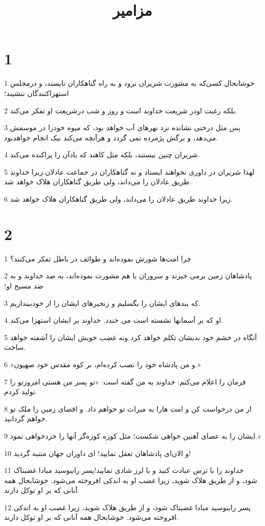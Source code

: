 

\title{مزامير}

 
\chapter{1}

\par 1 خوشابحال کسی‌که به مشورت شریران نرود و به راه گناهکاران نایستد، و درمجلس استهزاکنندگان ننشیند؛
\par 2 بلکه رغبت اودر شریعت خداوند است و روز و شب درشریعت او تفکر می‌کند.
\par 3 پس مثل درختی نشانده نزد نهرهای آب خواهد بود، که میوه خودرا در موسمش می‌دهد، و برگش پژمرده نمی گردد و هر‌آنچه می‌کند نیک انجام خواهدبود.
\par 4 شریران چنین نیستند، بلکه مثل کاهند که بادآن را پراکنده می‌کند.
\par 5 لهذا شریران در داوری نخواهند ایستاد و نه گناهکاران در جماعت عادلان.زیرا خداوند طریق عادلان را می‌داند، ولی طریق گناهکاران هلاک خواهد شد.
\par 6 زیرا خداوند طریق عادلان را می‌داند، ولی طریق گناهکاران هلاک خواهد شد.
 
\chapter{2}

\par 1 چرا امت‌ها شورش نموده‌اند و طوائف در باطل تفکر می‌کنند؟
\par 2 پادشاهان زمین برمی خیزند و سروران با هم مشورت نموده‌اند، به ضد خداوند و به ضد مسیح او؛
\par 3 که بندهای ایشان را بگسلیم و زنجیرهای ایشان را از خودبیندازیم.
\par 4 او که بر آسمانها نشسته است می خندد. خداوند بر ایشان استهزا می‌کند.
\par 5 آنگاه در خشم خود بدیشان تکلم خواهد کرد وبه غضب خویش ایشان را آشفته خواهد ساخت.
\par 6 «و من پادشاه خود را نصب کرده‌ام، بر کوه مقدس خود صهیون.»
\par 7 فرمان را اعلام می‌کنم: خداوند به من گفته است: «تو پسر من هستی امروزتو را تولید کردم.
\par 8 از من درخواست کن و امت هارا به میراث تو خواهم داد. و اقصای زمین را ملک تو خواهم گردانید.
\par 9 ایشان را به عصای آهنین خواهی شکست؛ مثل کوزه کوزه‌گر آنها را خردخواهی نمود.»
\par 10 و الان‌ای پادشاهان تعقل نمایید! ای داوران جهان متنبه گردید!
\par 11 خداوند را با ترس عبادت کنید و با لرز شادی نمایید!پسر راببوسید مبادا غضبناک شود، و از طریق هلاک شوید، زیرا غضب او به اندکی افروخته می‌شود. خوشابحال همه آنانی که بر او توکل دارند.
\par 12 پسر راببوسید مبادا غضبناک شود، و از طریق هلاک شوید، زیرا غضب او به اندکی افروخته می‌شود. خوشابحال همه آنانی که بر او توکل دارند.
 
